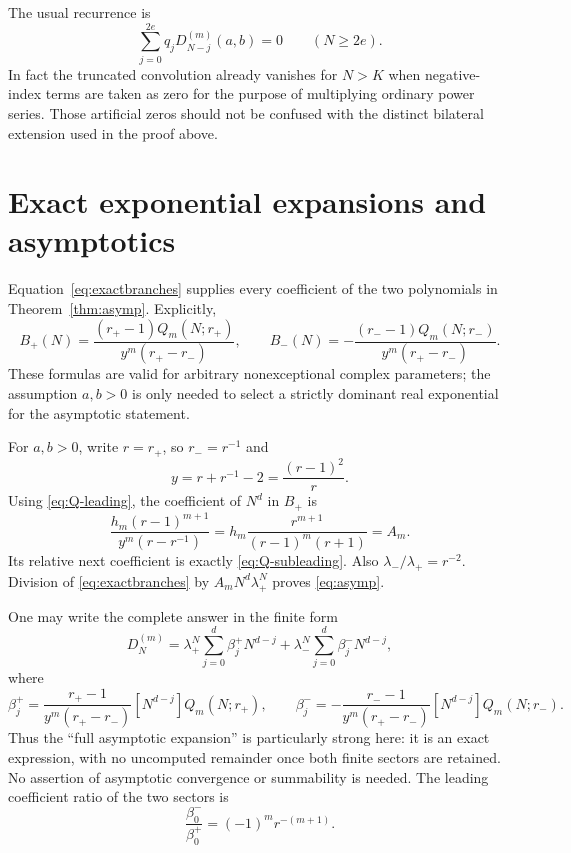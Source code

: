 \documentclass[11pt,a4paper]{article}
\numberwithin{equation}{section}
\theoremstyle{definition}
\theoremstyle{remark}
\newcommand{\D}[2]{D_{#1}^{(#2)}}
\begin{document}
The usual recurrence is
\begin{equation}\label{eq:recurrence}
 \sum_{j=0}^{2e}q_j\D{N-j}{m}(a,b)=0\qquad(N\geq2e).
\end{equation}
In fact the truncated convolution already vanishes for $N>K$ when
negative-index terms are taken as zero for the purpose of multiplying
ordinary power series.  Those artificial zeros should not be confused
with the distinct bilateral extension used in the proof above.

\section{Exact exponential expansions and asymptotics}\label{sec:asymptotics}

Equation~\eqref{eq:exactbranches} supplies every coefficient of the two
polynomials in Theorem~\ref{thm:asymp}.  Explicitly,
\begin{equation}\label{eq:Bpolys}
 B_+(N)=\frac{(r_+-1)Q_m(N;r_+)}{y^m(r_+-r_-)},\qquad
 B_-(N)=-\frac{(r_--1)Q_m(N;r_-)}{y^m(r_+-r_-)}.
\end{equation}
These formulas are valid for arbitrary nonexceptional complex parameters;
the assumption $a,b>0$ is only needed to select a strictly dominant real
exponential for the asymptotic statement.

For $a,b>0$, write $r=r_+$, so $r_-=r^{-1}$ and
\begin{equation}\label{eq:yparam}
 y=r+r^{-1}-2=\frac{(r-1)^2}{r}.
\end{equation}
Using \eqref{eq:Q-leading}, the coefficient of $N^d$ in $B_+$ is
\[
 \frac{h_m(r-1)^{m+1}}{y^m(r-r^{-1})}
 =h_m\frac{r^{m+1}}{(r-1)^m(r+1)}=A_m.
\]
Its relative next coefficient is exactly \eqref{eq:Q-subleading}.
Also $\lambda_-/\lambda_+=r^{-2}$.  Division of
\eqref{eq:exactbranches} by $A_mN^d\lambda_+^N$ proves
\eqref{eq:asymp}.

One may write the complete answer in the finite form
\begin{equation}\label{eq:fullfinite}
 \D{N}{m}=\lambda_+^N\sum_{j=0}^{d}\beta_j^+N^{d-j}
          +\lambda_-^N\sum_{j=0}^{d}\beta_j^-N^{d-j},
\end{equation}
where
\begin{equation}\label{eq:allbetas}
 \beta_j^+=\frac{r_+-1}{y^m(r_+-r_-)}[N^{d-j}]Q_m(N;r_+),\qquad
 \beta_j^-=-\frac{r_--1}{y^m(r_+-r_-)}[N^{d-j}]Q_m(N;r_-).
\end{equation}
Thus the ``full asymptotic expansion'' is particularly strong here:
it is an exact expression, with no uncomputed remainder once both
finite sectors are retained.  No assertion of asymptotic convergence
or summability is needed.  The leading coefficient ratio of the two
sectors is
\begin{equation}\label{eq:branchratio}
 \frac{\beta_0^-}{\beta_0^+}=(-1)^m r^{-(m+1)}.
\end{equation}
\end{document}
